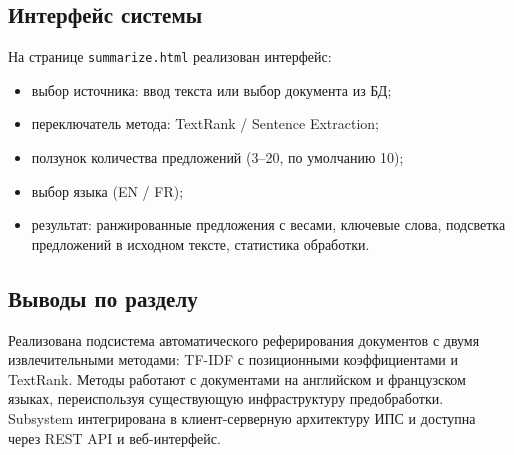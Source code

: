\subsection{Интерфейс системы}

На странице \texttt{summarize.html} реализован интерфейс:

\begin{itemize}
	\item выбор источника: ввод текста или выбор документа из БД;
	\item переключатель метода: TextRank / Sentence Extraction;
	\item ползунок количества предложений (3--20, по умолчанию 10);
	\item выбор языка (EN / FR);
	\item результат: ранжированные предложения с весами, ключевые слова,
	подсветка предложений в исходном тексте, статистика обработки.
\end{itemize}

\subsection{Выводы по разделу}

Реализована подсистема автоматического реферирования документов с двумя
извлечительными методами: TF-IDF с позиционными коэффициентами и TextRank.
Методы работают с документами на английском и французском языках, переиспользуя
существующую инфраструктуру предобработки. Subsystem интегрирована в
клиент-серверную архитектуру ИПС и доступна через REST API и веб-интерфейс.
